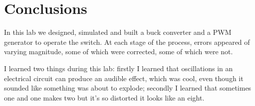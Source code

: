 \section{Conclusions}


In this lab we designed, simulated and built a buck converter and a PWM generator to operate the switch. At each stage of the process, errors appeared of varying magnitude, some of which were corrected, some of which were not. 

I learned two things during this lab: firstly I learned that oscillations in an electrical circuit can produce an audible effect, which was cool, even though it sounded like something was about to explode; secondly I learned that sometimes one and one makes two but it's so distorted it looks like an eight.